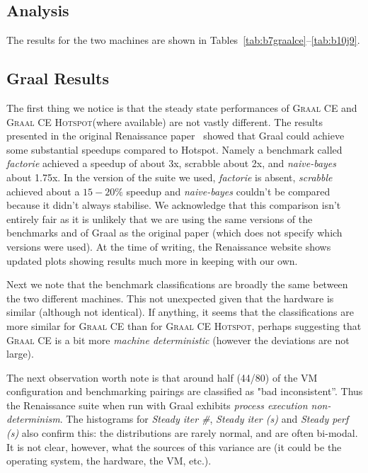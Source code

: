 \documentclass[a4paper]{article}
\newcommand{\graalce}{\textsc{Graal CE}\xspace}
\newcommand{\graalcehs}{\textsc{Graal CE Hotspot}\xspace}
\begin{document}
\subsection{Analysis}

The results for the two machines are shown in
Tables~\ref{tab:b7graalce}--\ref{tab:b10j9}.

\subsection{Graal Results}

The first thing we notice is that the steady state performances
of \graalce and \graalcehs (where available) are not vastly different. The results
presented in the original Renaissance paper~\cite{prokopec19renaissance} showed
that Graal could achieve some substantial speedups compared to Hotspot. Namely
a benchmark called \emph{factorie} achieved a speedup of about 3x, scrabble
about 2x, and \emph{naive-bayes} about 1.75x. In the version of the suite we
used, \emph{factorie} is absent, \emph{scrabble} achieved about a $15-20\%$
speedup and \emph{naive-bayes} couldn't be compared because it
didn't always stabilise. We acknowledge that this comparison isn't entirely
fair as it is unlikely that we are using the same versions of the benchmarks
and of Graal as the original paper (which does not specify which versions were
used). At the time of writing, the Renaissance website shows updated plots
showing results much more in keeping with our own.

Next we note that the benchmark classifications are broadly the same between
the two different machines. This not unexpected given that the hardware is
similar (although not identical). If anything, it seems that the
classifications are more similar for \graalce than for \graalcehs, perhaps
suggesting that \graalce is a bit more \emph{machine deterministic} (however
the deviations are not large).

The next observation worth note is that around half (44/80) of the VM
configuration and benchmarking pairings are classified as "bad inconsistent''.
Thus the Renaissance suite when run with Graal exhibits \emph{process execution non-determinism}. The histograms for \emph{Steady iter \#}, \emph{Steady
iter (s)} and \emph{Steady perf (s)} also confirm this: the distributions are rarely
normal, and are often bi-modal. It is not clear, however, what the sources of
this variance are (it could be the operating system, the hardware, the VM, etc.).
\end{document}
